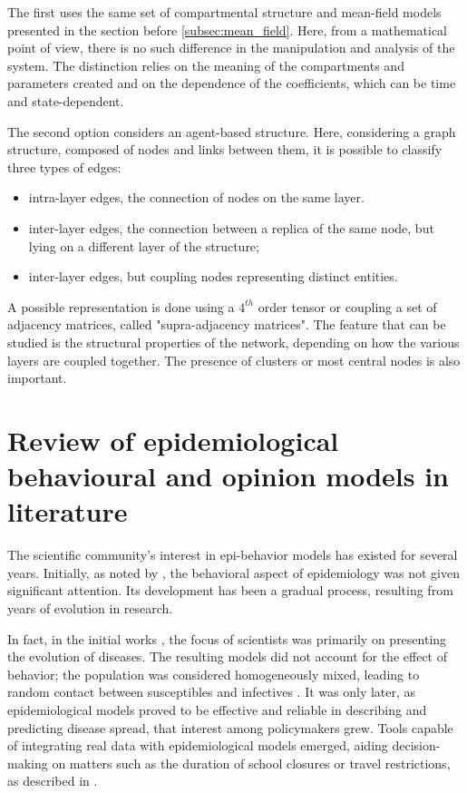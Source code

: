 The first uses the same set of compartmental structure and mean-field models presented in the section before \ref{subsec:mean_field}. Here, from a mathematical point of view, there is no such difference in the manipulation and analysis of the system. The distinction relies on the meaning of the compartments and parameters created and on the dependence of the coefficients, which can be time and state-dependent.

The second option considers an agent-based structure. Here, considering a graph structure, composed of nodes and links between them, it is possible to classify three types of edges:
\begin{itemize}
	\item intra-layer edges, the connection of nodes on the same layer.
	\item inter-layer edges, the connection between a replica of the same node, but lying on a different layer of the structure;
	\item inter-layer edges, but coupling nodes representing distinct entities. 
\end{itemize}

A possible representation is done using a $4^{th}$ order tensor or coupling a set of adjacency matrices, called "supra-adjacency matrices". The feature that can be studied is the structural properties of the network, depending on how the various layers are coupled together. The presence of clusters or most central nodes is also important.

 
\chapter{Review of epidemiological behavioural and opinion models in literature}
The scientific community's interest in epi-behavior models has existed for several years. Initially, as noted by \cite{Bauch_2012_overview}, the behavioral aspect of epidemiology was not given significant attention. Its development has been a gradual process, resulting from years of evolution in research.

In fact, in the initial works \cite{kermack1927}, the focus of scientists was primarily on presenting the evolution of diseases. The resulting models did not account for the effect of behavior; the population was considered homogeneously mixed, leading to random contact between susceptibles and infectives \cite{Hernandez_Vargas_2022, Mata2021}. 
It was only later, as epidemiological models proved to be effective and reliable in describing and predicting disease spread, that interest among policymakers grew. Tools capable of integrating real data with epidemiological models emerged, aiding decision-making on matters such as the duration of school closures or travel restrictions, as described in \cite{Bauch_2012_overview}.

